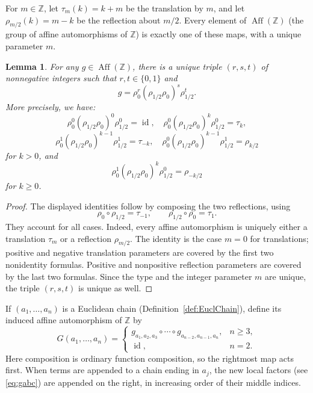 \documentclass[12pt,letterpaper]{article}
\numberwithin{equation}{section}
\newcommand{\Z}{\mathbb Z}
\newcommand{\Aff}{\operatorname{Aff}}
\newcommand{\id}{\operatorname{id}}
\theoremstyle{plain}
\newtheorem{lemma}[theorem]{Lemma}
\theoremstyle{definition}
\begin{document}
For $m\in\Z$, let $\tau_m(k)=k+m$ be the translation by $m$, and let $\rho_{m/2}(k)=m-k$ be the reflection about $m/2$. Every element of $\Aff(\Z)$ (the group of affine automorphisms of $\Z$) is exactly one of these maps, with a unique parameter $m$.

\begin{lemma}\label{lem:words}
For any $g\in\Aff(\Z)$, there is a unique triple $(r,s,t)$ of nonnegative integers such that $r,t\in\{0,1\}$ and 
\[
 g=\rho_0^r(\rho_{1/2}\rho_0)^s\rho_{1/2}^t.
\]
 More precisely, we have:
\[
\rho_0^0(\rho_{1/2}\rho_0)^0\rho_{1/2}^0=\id,\quad \rho_0^0(\rho_{1/2}\rho_0)^k\rho_{1/2}^0=\tau_k,
\] 
\[
\rho_0^1(\rho_{1/2}\rho_0)^{k-1}\rho_{1/2}^1=\tau_{-k},\quad \rho_0^0(\rho_{1/2}\rho_0)^{k-1}\rho_{1/2}^1=\rho_{k/2}
\] 
for $k>0$, and 
\[
\rho_0^1(\rho_{1/2}\rho_0)^k\rho_{1/2}^0=\rho_{-k/2}
\] 
for $k\ge0$.  
\end{lemma}

\begin{proof}
The displayed identities follow by composing the two reflections, using
\[
 \rho_0\circ\rho_{1/2}=\tau_{-1},
 \qquad
 \rho_{1/2}\circ\rho_0=\tau_1.
\]
They account for all cases. Indeed, every affine automorphism is uniquely either a translation $\tau_m$ or a reflection $\rho_{m/2}$. The identity is the case $m=0$ for translations; positive and negative translation parameters are covered by the first two nonidentity formulas. Positive and nonpositive reflection parameters are covered by the last two formulas. Since the type and the integer parameter $m$ are unique, the triple $(r,s,t)$ is unique as well.
\end{proof}


If $(a_1,\ldots,a_n)$ is a Euclidean chain (Definition~\ref{def:EuclChain}), define its induced affine automorphism of $\Z$ by
\begin{equation}\label{eq:chain-map}
 G(a_1,\ldots,a_n)=
 \begin{cases}
  g_{a_1,a_2,a_3}\circ\cdots\circ g_{a_{n-2},a_{n-1},a_n},&n\geq3,\\
  \id,&n=2.
 \end{cases}
\end{equation}
Here composition is ordinary function composition, so the rightmost map acts first. When terms are appended to a chain ending in $a_j$, the new local factors (see \eqref{eq:gabc}) are appended on the right, in increasing order of their middle indices.
\end{document}
